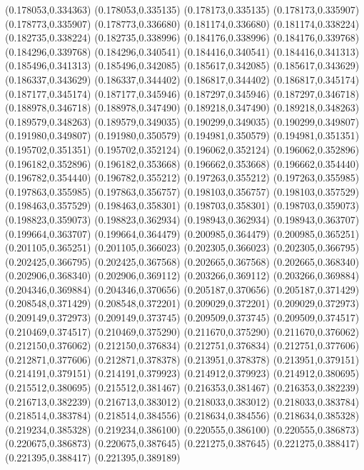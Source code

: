 (0.178053,0.334363)
(0.178053,0.335135)
(0.178173,0.335135)
(0.178173,0.335907)
(0.178773,0.335907)
(0.178773,0.336680)
(0.181174,0.336680)
(0.181174,0.338224)
(0.182735,0.338224)
(0.182735,0.338996)
(0.184176,0.338996)
(0.184176,0.339768)
(0.184296,0.339768)
(0.184296,0.340541)
(0.184416,0.340541)
(0.184416,0.341313)
(0.185496,0.341313)
(0.185496,0.342085)
(0.185617,0.342085)
(0.185617,0.343629)
(0.186337,0.343629)
(0.186337,0.344402)
(0.186817,0.344402)
(0.186817,0.345174)
(0.187177,0.345174)
(0.187177,0.345946)
(0.187297,0.345946)
(0.187297,0.346718)
(0.188978,0.346718)
(0.188978,0.347490)
(0.189218,0.347490)
(0.189218,0.348263)
(0.189579,0.348263)
(0.189579,0.349035)
(0.190299,0.349035)
(0.190299,0.349807)
(0.191980,0.349807)
(0.191980,0.350579)
(0.194981,0.350579)
(0.194981,0.351351)
(0.195702,0.351351)
(0.195702,0.352124)
(0.196062,0.352124)
(0.196062,0.352896)
(0.196182,0.352896)
(0.196182,0.353668)
(0.196662,0.353668)
(0.196662,0.354440)
(0.196782,0.354440)
(0.196782,0.355212)
(0.197263,0.355212)
(0.197263,0.355985)
(0.197863,0.355985)
(0.197863,0.356757)
(0.198103,0.356757)
(0.198103,0.357529)
(0.198463,0.357529)
(0.198463,0.358301)
(0.198703,0.358301)
(0.198703,0.359073)
(0.198823,0.359073)
(0.198823,0.362934)
(0.198943,0.362934)
(0.198943,0.363707)
(0.199664,0.363707)
(0.199664,0.364479)
(0.200985,0.364479)
(0.200985,0.365251)
(0.201105,0.365251)
(0.201105,0.366023)
(0.202305,0.366023)
(0.202305,0.366795)
(0.202425,0.366795)
(0.202425,0.367568)
(0.202665,0.367568)
(0.202665,0.368340)
(0.202906,0.368340)
(0.202906,0.369112)
(0.203266,0.369112)
(0.203266,0.369884)
(0.204346,0.369884)
(0.204346,0.370656)
(0.205187,0.370656)
(0.205187,0.371429)
(0.208548,0.371429)
(0.208548,0.372201)
(0.209029,0.372201)
(0.209029,0.372973)
(0.209149,0.372973)
(0.209149,0.373745)
(0.209509,0.373745)
(0.209509,0.374517)
(0.210469,0.374517)
(0.210469,0.375290)
(0.211670,0.375290)
(0.211670,0.376062)
(0.212150,0.376062)
(0.212150,0.376834)
(0.212751,0.376834)
(0.212751,0.377606)
(0.212871,0.377606)
(0.212871,0.378378)
(0.213951,0.378378)
(0.213951,0.379151)
(0.214191,0.379151)
(0.214191,0.379923)
(0.214912,0.379923)
(0.214912,0.380695)
(0.215512,0.380695)
(0.215512,0.381467)
(0.216353,0.381467)
(0.216353,0.382239)
(0.216713,0.382239)
(0.216713,0.383012)
(0.218033,0.383012)
(0.218033,0.383784)
(0.218514,0.383784)
(0.218514,0.384556)
(0.218634,0.384556)
(0.218634,0.385328)
(0.219234,0.385328)
(0.219234,0.386100)
(0.220555,0.386100)
(0.220555,0.386873)
(0.220675,0.386873)
(0.220675,0.387645)
(0.221275,0.387645)
(0.221275,0.388417)
(0.221395,0.388417)
(0.221395,0.389189)
